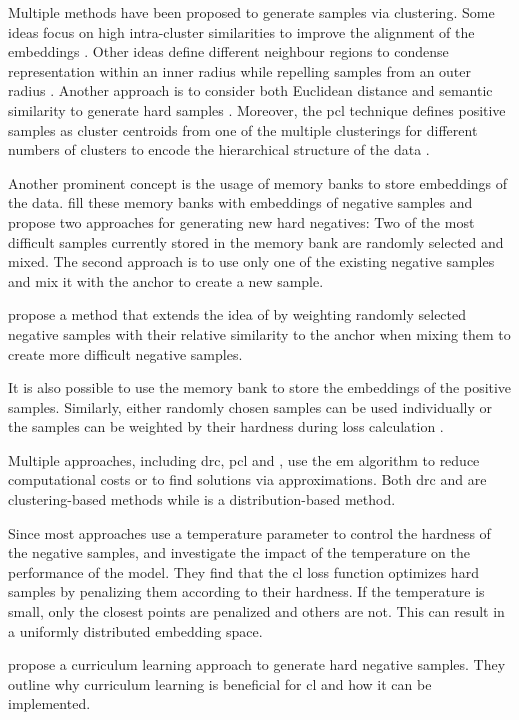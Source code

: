 Multiple methods have been proposed to generate samples via clustering.
Some ideas focus on high intra-cluster similarities to improve the alignment of the embeddings \citet{DRC_2020}.
Other ideas define different neighbour regions to condense representation within an inner radius 
while repelling samples from an outer radius \citet{local_aggr_2019}.
Another approach is to consider both Euclidean distance and semantic similarity to generate hard samples \citet{mining_manifolds_2018}.
Moreover, the \ac{pcl} technique defines positive samples as cluster centroids 
from one of the multiple clusterings for different numbers of clusters 
to encode the hierarchical structure of the data \citet{PCL_2021}.


Another prominent concept is the usage of memory banks to store embeddings of the data.
\citet{mochi_2020} fill these memory banks with embeddings of negative samples 
and propose two approaches for generating new hard negatives: 
Two of the most difficult samples currently stored in the memory bank are randomly selected and mixed.
The second approach is to use only one of the existing negative samples and 
mix it with the anchor to create a new sample.

\citet{progcl_2022} propose a method that extends the idea of \citet{mochi_2020} by weighting randomly selected negative samples 
with their relative similarity to the anchor when mixing them to create more difficult negative samples.

It is also possible to use the memory bank to store the embeddings of the positive samples.
Similarly, either randomly chosen samples can be used individually or 
the samples can be weighted by their hardness during loss calculation \citet{mining_potential_2024}.


Multiple approaches, including \ac{drc}, \ac{pcl} and \progcl{}, use the \ac{em} algorithm 
to reduce computational costs or to find solutions via approximations.
Both \ac{drc} \citet{DRC_2020} and \progcl{} \citet{PCL_2021} are clustering-based methods 
while \progcl{} \citet{progcl_2022} is a distribution-based method.

Since most approaches use a temperature parameter to control the hardness of the negative samples, 
\citet{CL_temp_2021} and \citet{grape_2024} investigate the impact of the temperature on the performance of the model.
They find that the \ac{cl} loss function optimizes hard samples by penalizing them according to their hardness.
If the temperature is small, only the closest points are penalized and others are not.
This can result in a uniformly distributed embedding space.

\citet{curricular_weighting_2024} propose a curriculum learning approach to generate hard negative samples.
They outline why curriculum learning is beneficial for \ac{cl} and how it can be implemented.

